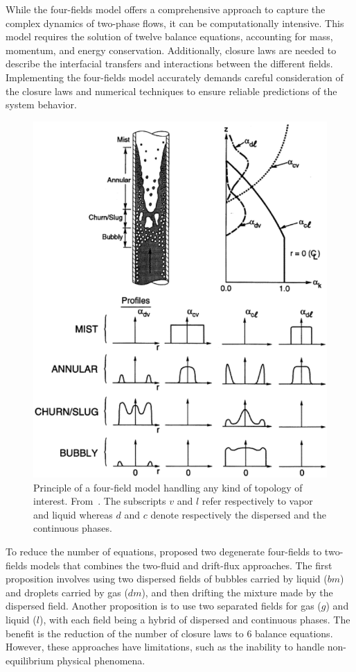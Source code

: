 While the four-fields model offers a comprehensive approach to capture the complex dynamics of two-phase flows, it can be computationally intensive. This model requires the solution of twelve balance equations, accounting for mass, momentum, and energy conservation. Additionally, closure laws are needed to describe the interfacial transfers and interactions between the different fields. Implementing the four-fields model accurately demands careful consideration of the closure laws and numerical techniques to ensure reliable predictions of the system behavior.
\begin{figure}[!ht]
    \centering
    \includegraphics[scale=0.4]{Figure/Lahey.png}
    \caption{Principle of a four-field model handling any kind of topology of interest. From~\textcite{Lahey2001}. The subscripts $v$ and $l$ refer respectively to vapor and liquid whereas $d$ and $c$ denote respectively the dispersed and the continuous phases.}
    \label{fig:lahey}
\end{figure}
To reduce the number of equations, \textcite{Morel2007} proposed two degenerate four-fields to two-fields models that combines the two-fluid and drift-flux approaches. The first proposition involves using two dispersed fields of bubbles carried by liquid ($bm$) and droplets carried by gas ($dm$), and then drifting the mixture made by the dispersed field. Another proposition is to use two separated fields for gas ($g$) and liquid ($l$), with each field being a hybrid of dispersed and continuous phases.
The benefit is the reduction of the number of closure laws to 6 balance equations. However, these approaches have limitations, such as the inability to handle non-equilibrium physical phenomena.


